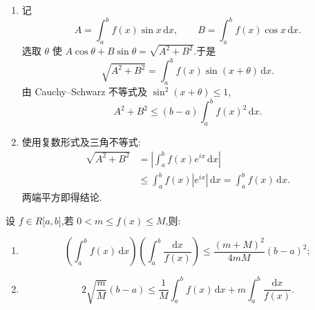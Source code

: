 \begin{solution}
    \leavevmode
    \begin{enumerate}
        \item 记
              \[
                  A=\int_a^bf(x)\sin x\,\mathrm{d}x,
                  \qquad
                  B=\int_a^bf(x)\cos x\,\mathrm{d}x.
              \]
              选取 $\theta$ 使 $A\cos\theta+B\sin\theta=\sqrt{A^2+B^2}$.于是
              \[
                  \sqrt{A^2+B^2}
                  =\int_a^bf(x)\sin(x+\theta)\,\mathrm{d}x.
              \]
              由 Cauchy--Schwarz 不等式及 $\sin^2(x+\theta)\leq1$,
              \[
                  A^2+B^2\leq(b-a)\int_a^bf(x)^2\,\mathrm{d}x.
              \]

        \item 使用复数形式及三角不等式:
              \[
                  \begin{aligned}
                      \sqrt{A^2+B^2}
                       & =\left|\int_a^bf(x)e^{ix}\,\mathrm{d}x\right| \\
                       & \leq\int_a^bf(x)|e^{ix}|\,\mathrm{d}x
                      =\int_a^bf(x)\,\mathrm{d}x.
                  \end{aligned}
              \]
              两端平方即得结论.
    \end{enumerate}
\end{solution}

\begin{example}
    设 $f\in R\lbrack a,b\rbrack$,若 $0<m\leq f(x)\leq M$,则:
    \begin{enumerate}
        \item
              \[
                  \left(\int_a^bf(x)\,\mathrm{d}x\right)
                  \left(\int_a^b\dfrac{\mathrm{d}x}{f(x)}\right)
                  \leq\dfrac{(m+M)^2}{4mM}(b-a)^2;
              \]
        \item
              \[
                  2\sqrt{\dfrac{m}{M}}(b-a)
                  \leq\dfrac{1}{M}\int_a^bf(x)\,\mathrm{d}x
                  +m\int_a^b\dfrac{\mathrm{d}x}{f(x)}.
              \]
    \end{enumerate}
\end{example}
\exampleblank

